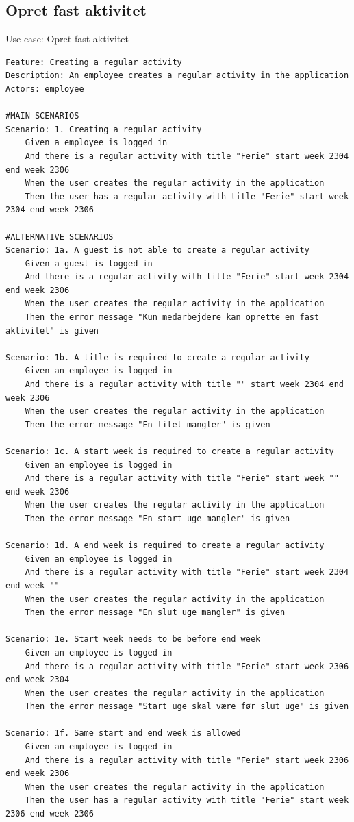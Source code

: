 \subsection{Opret fast aktivitet} 
\begin{listing}[H]
    \centering
    \caption{Use case: Opret fast aktivitet}\label{lst:usecase_regular_activity}
    \begin{verbatim}  
Feature: Creating a regular activity
Description: An employee creates a regular activity in the application
Actors: employee

#MAIN SCENARIOS
Scenario: 1. Creating a regular activity
    Given a employee is logged in
    And there is a regular activity with title "Ferie" start week 2304 end week 2306 
    When the user creates the regular activity in the application 
    Then the user has a regular activity with title "Ferie" start week 2304 end week 2306

#ALTERNATIVE SCENARIOS
Scenario: 1a. A guest is not able to create a regular activity
    Given a guest is logged in
    And there is a regular activity with title "Ferie" start week 2304 end week 2306   
    When the user creates the regular activity in the application 
    Then the error message "Kun medarbejdere kan oprette en fast aktivitet" is given

Scenario: 1b. A title is required to create a regular activity
    Given an employee is logged in
    And there is a regular activity with title "" start week 2304 end week 2306 
    When the user creates the regular activity in the application 
    Then the error message "En titel mangler" is given

Scenario: 1c. A start week is required to create a regular activity
    Given an employee is logged in
    And there is a regular activity with title "Ferie" start week "" end week 2306 
    When the user creates the regular activity in the application 
    Then the error message "En start uge mangler" is given

Scenario: 1d. A end week is required to create a regular activity
    Given an employee is logged in
    And there is a regular activity with title "Ferie" start week 2304 end week "" 
    When the user creates the regular activity in the application 
    Then the error message "En slut uge mangler" is given

Scenario: 1e. Start week needs to be before end week
    Given an employee is logged in
    And there is a regular activity with title "Ferie" start week 2306 end week 2304 
    When the user creates the regular activity in the application 
    Then the error message "Start uge skal være før slut uge" is given

Scenario: 1f. Same start and end week is allowed
    Given an employee is logged in
    And there is a regular activity with title "Ferie" start week 2306 end week 2306 
    When the user creates the regular activity in the application 
    Then the user has a regular activity with title "Ferie" start week 2306 end week 2306

    \end{verbatim}
\end{listing}


